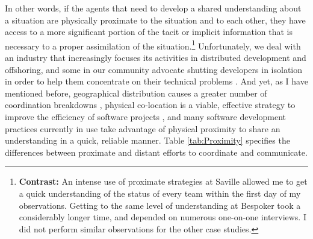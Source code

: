 In other words, if the agents that need to develop a shared understanding about a situation are physically proximate to the situation and to each other, they have access to a more significant portion of the tacit or implicit information that is necessary to a proper assimilation of the situation.\footnote{\textbf{Contrast:} An intense use of proximate strategies at Saville allowed me to get a quick understanding of the status of every team within the first day of my observations. Getting to the same level of understanding at Bespoker took a considerably longer time, and depended on numerous one-on-one interviews. I did not perform similar observations for the other case studies.} Unfortunately, we deal with an industry that increasingly focuses its activities in distributed development and offshoring, and some in our community advocate shutting developers in isolation in order to help them concentrate on their technical problems \cite{DeMarco1987}. And yet, as I have mentioned before, geographical distribution causes a greater number of coordination breakdowns \cite{Herbsleb1999}, physical co-location is a viable, effective strategy to improve the efficiency of software projects \cite{Teasley2002}, and many software development practices currently in use take advantage of physical proximity to share an understanding in a quick, reliable manner. Table \ref{tab:Proximity} specifies the differences between proximate and distant efforts to coordinate and communicate.

